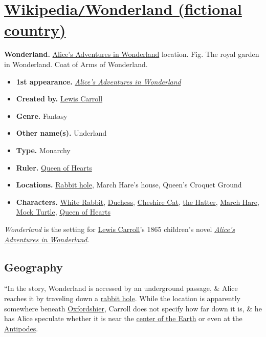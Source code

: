 \documentclass[oneside]{book}
\numberwithin{equation}{section}
\begin{document}
\section{\href{https://en.wikipedia.org/wiki/Wonderland_(fictional_country)}{Wikipedia\texttt{/}Wonderland (fictional country)}}
\textbf{Wonderland.} \href{https://en.wikipedia.org/wiki/Alice%27s_Adventures_in_Wonderland}{Alice's Adventures in Wonderland} location. \textsf{Fig. The royal garden in Wonderland.} Coat of Arms of Wonderland.
\begin{itemize}
	\item \textbf{1st appearance.} \href{https://en.wikipedia.org/wiki/Alice%27s_Adventures_in_Wonderland}{\textit{Alice's Adventures in Wonderland}}
	\item \textbf{Created by.} \href{https://en.wikipedia.org/wiki/Lewis_Carroll}{Lewis Carroll}
	\item \textbf{Genre.} Fantasy
	\item \textbf{Other name(s).} Underland
	\item \textbf{Type.} Monarchy
	\item \textbf{Ruler.} \href{https://en.wikipedia.org/wiki/Queen_of_Hearts_(Alice%27s_Adventures_in_Wonderland)}{Queen of Hearts}
	\item \textbf{Locations.} \href{https://en.wikipedia.org/wiki/Burrow}{Rabbit hole}, March Hare's house, Queen's Croquet Ground
	\item \textbf{Characters.} \href{https://en.wikipedia.org/wiki/White_Rabbit}{White Rabbit}, \href{https://en.wikipedia.org/wiki/Duchess_(Alice%27s_Adventures_in_Wonderland)}{Duchess}, \href{https://en.wikipedia.org/wiki/Cheshire_Cat}{Cheshire Cat}, \href{https://en.wikipedia.org/wiki/The_Hatter}{the Hatter}, \href{https://en.wikipedia.org/wiki/March_Hare}{March Hare}, \href{https://en.wikipedia.org/wiki/Mock_Turtle}{Mock Turtle}, \href{https://en.wikipedia.org/wiki/Queen_of_Hearts_(Alice%27s_Adventures_in_Wonderland)}{Queen of Hearts}
\end{itemize}
\textit{Wonderland} is the setting for \href{https://en.wikipedia.org/wiki/Lewis_Carroll}{Lewis Carroll}'s 1865 children's novel \href{https://en.wikipedia.org/wiki/Alice%27s_Adventures_in_Wonderland}{\textit{Alice's Adventures in Wonderland}}.

\subsection{Geography}
``In the story, Wonderland is accessed by an underground passage, \& Alice reaches it by traveling down a \href{https://en.wikipedia.org/wiki/Burrow}{rabbit hole}. While the location is apparently somewhere beneath \href{https://en.wikipedia.org/wiki/Oxfordshire}{Oxfordshier}, Carroll does not specify how far down it is, \& he has Alice speculate whether it is near the \href{https://en.wikipedia.org/wiki/Center_of_the_Earth}{center of the Earth} or even at the \href{https://en.wikipedia.org/wiki/Antipodes}{Antipodes}.
\end{document}
